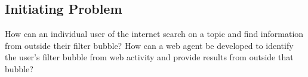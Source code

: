 \subsection*{Initiating Problem} How can an individual user of the internet
search on a topic and find information from outside their filter bubble? 
How can a web agent be developed to identify the user's filter bubble from web
activity and provide results from outside that bubble?

